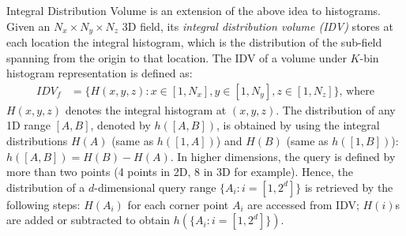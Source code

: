 Integral Distribution Volume is an extension of the above idea to histograms. Given an $N_x\times N_y\times N_z$ 3D field, its \emph{integral distribution volume (IDV)} stores at each location the integral histogram, which is the distribution of the sub-field spanning from the origin to that location. The IDV of a volume under $K$-bin histogram representation is defined as:
\begin{align*}
IDV_f&= \{ H(x,y,z) : x\in [1,N_x], y\in [1,N_y], z\in [1,N_z]\}\text{, where}
\end{align*}
$H(x,y,z)$ denotes the integral histogram at $(x,y,z)$. The distribution of any 1D range $[A, B]$, denoted by $h([A, B])$, is obtained by using the integral distributions $H(A)$ (same as $h([1, A])$) and $H(B)$ (same as $h([1, B])$): $h([A, B]) = H(B) - H(A)$. In higher dimensions, the query is defined by more than two points (4 points in 2D, 8 in 3D for example). Hence, the distribution of a $d$-dimensional query range $\{A_i:i=[1,2^d]\}$ is retrieved by the following steps: $H(A_i)$ for each corner point $A_i$ are accessed from IDV; $H(i)$s are added or subtracted to obtain $h(\{A_i:i=[1,2^d]\})$. 
